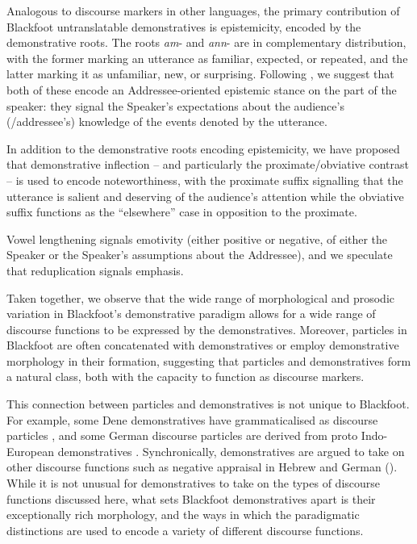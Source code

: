 \documentclass[output=paper,colorlinks,citecolor=brown]{langscibook}
\begin{document}
Analogous to discourse markers in other languages, the primary contribution of Blackfoot untranslatable demonstratives is epistemicity, encoded by the demonstrative roots. The roots \textit{am}- and \textit{ann}- are in complementary distribution, with the former marking an utterance as familiar, expected, or repeated, and the latter marking it as unfamiliar, new, or surprising. Following \citet{Thoma2017}, we suggest that both of these encode an Addressee-oriented epistemic stance on the part of the speaker: they signal the Speaker’s expectations about the audience’s (/addressee’s) knowledge of the events denoted by the utterance. 

In addition to the demonstrative roots encoding epistemicity, we have proposed that demonstrative inflection – and particularly the proximate/obviative contrast – is used to encode noteworthiness, with the proximate suffix signalling that the utterance is salient and deserving of the audience’s attention while the obviative suffix functions as the “elsewhere” case in opposition to the proximate.

Vowel lengthening signals emotivity (either positive or negative, of either the Speaker or the Speaker’s assumptions about the Addressee), and we speculate that reduplication signals emphasis. 

Taken together, we observe that the wide range of morphological and prosodic variation in Blackfoot’s demonstrative paradigm allows for a wide range of discourse functions to be expressed by the demonstratives. Moreover, particles in Blackfoot are often concatenated with demonstratives or employ demonstrative morphology in their formation, suggesting that particles and demonstratives form a natural class, both with the capacity to function as discourse markers.

This connection between particles and demonstratives is not unique to Blackfoot. For example, some Dene demonstratives have grammaticalised as discourse particles \citep{ThompsonCoxRice2011}, and some German discourse particles are derived from proto Indo-European demonstratives \citep{Thoma2017}. Synchronically, demonstratives are argued to take on other discourse functions such as negative appraisal in Hebrew and German (\citealt{SichelWiltschko2018}). While it is not unusual for demonstratives to take on the types of discourse functions discussed here, what sets Blackfoot demonstratives apart is their exceptionally rich morphology, and the ways in which the paradigmatic distinctions are used to encode a variety of different discourse functions.
\end{document}
